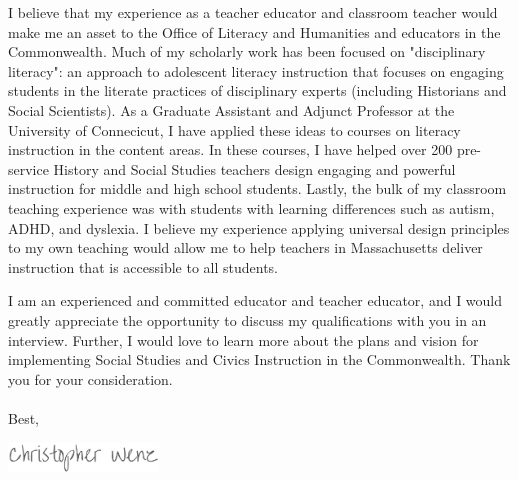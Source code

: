 \documentclass[11pt, a4paper]{awesome-cv}
\begin{document}
\begin{cvletter}
I believe that my experience as a teacher educator and classroom teacher would make me an asset to the Office of Literacy and Humanities and educators in the Commonwealth. Much of my scholarly work has been focused on "disciplinary literacy": an approach to adolescent literacy instruction that focuses on engaging students in the literate practices of disciplinary experts (including Historians and Social Scientists). As a Graduate Assistant and Adjunct Professor at the University of Connecicut, I have applied these ideas to courses on literacy instruction in the content areas. In these courses, I have helped over 200 pre-service History and Social Studies teachers design engaging and powerful instruction for middle and high school students. Lastly, the bulk of my classroom teaching experience was with students with learning differences such as autism, ADHD, and dyslexia. I believe my experience applying universal design principles to my own teaching would allow me to help teachers in Massachusetts deliver instruction that is accessible to all students.  

I am an experienced and committed educator and teacher educator, and I would greatly appreciate the opportunity to discuss my qualifications with you in an interview. Further, I would love to learn more about the plans and vision for implementing Social Studies and Civics Instruction in the Commonwealth. Thank you for your consideration.  
\\\\
Best,
\end{cvletter}

\includegraphics[width=4cm, height=0.8cm]{./img/sig.png}
\end{document}
